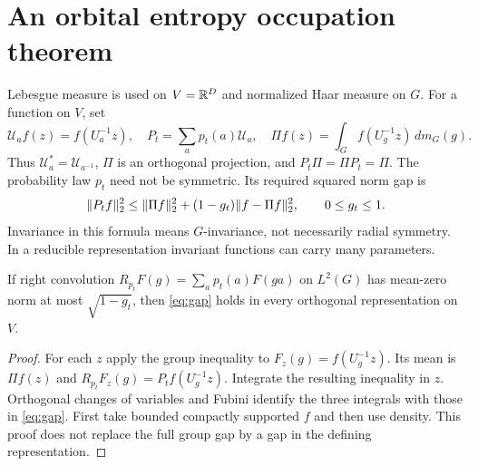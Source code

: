 \section{An orbital entropy occupation theorem}\label{sec:orbit}
Lebesgue measure is used on $V=\mathbb R^D$ and normalized Haar measure on $G$.
For a function on $V$, set
\begin{equation}\label{eq:operators}
 \mathcal U_a f(z)=f(U_a^{-1}z),\quad
 P_t=\sum_a p_t(a)\mathcal U_a,\quad
 \Pi f(z)=\int_G f(U_g^{-1}z)\,dm_G(g).
\end{equation}
Thus $\mathcal U_a^*=\mathcal U_{a^{-1}}$, $\Pi$ is an orthogonal
projection, and $P_t\Pi=\Pi P_t=\Pi$. The probability law $p_t$ need not
be symmetric. Its required squared norm gap is
\begin{equation}\label{eq:gap}
 \lVert P_t f\rVert_2^2\le\lVert\Pi f\rVert_2^2+(1-g_t)\lVert f-\Pi f\rVert_2^2,
 \qquad 0\le g_t\le1.
\end{equation}
Invariance in this formula means $G$-invariance, not necessarily radial
symmetry. In a reducible representation invariant functions can carry
many parameters.

\begin{lemma}\label{lem:transfer}
If right convolution $R_{p_t}F(g)=\sum_a p_t(a)F(ga)$ on
$L^2(G)$ has mean-zero norm at most $\sqrt{1-g_t}$, then
\eqref{eq:gap} holds in every orthogonal representation on $V$.
\end{lemma}
\begin{proof}
For each $z$ apply the group inequality to
$F_z(g)=f(U_g^{-1}z)$. Its mean is $\Pi f(z)$ and
$R_{p_t}F_z(g)=P_tf(U_g^{-1}z)$. Integrate the resulting inequality
in $z$. Orthogonal changes of variables and Fubini identify the three
integrals with those in \eqref{eq:gap}. First take bounded compactly
supported $f$ and then use density. This proof does not replace the full
group gap by a gap in the defining representation.
\end{proof}

